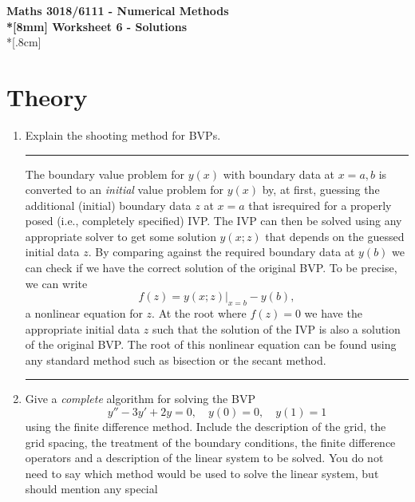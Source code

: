 \documentclass[10pt]{article}
\begin{document}
\thispagestyle{empty}
\begin{center}
\textbf{\Large Maths 3018/6111 - Numerical Methods \\*[8mm]
Worksheet 6 - Solutions}\\*[.8cm]
\end{center}

\section*{Theory}

\begin{enumerate}
\item Explain the shooting method for BVPs.
  \begin{center}
    \rule{0.9\textwidth}{.1pt}
  \end{center}
  The boundary value problem for $y(x)$ with boundary data at $x=a, b$
  is converted to an \emph{initial} value problem for $y(x)$ by, at
  first, guessing the additional (initial) boundary data $z$ at $x=a$
  that isrequired for a properly posed (i.e., completely specified)
  IVP. The IVP can then be solved using any appropriate solver to get
  some solution $y(x;z)$ that depends on the guessed initial data
  $z$. By comparing against the required boundary data at $y(b)$ we
  can check if we have the correct solution of the original BVP. To be
  precise, we can write
  \begin{equation*}
    f(z) = y(x;z)|_{x=b} - y(b),
  \end{equation*}
  a nonlinear equation for $z$. At the root where $f(z) = 0$ we have
  the appropriate initial data $z$ such that the solution of the IVP
  is also a solution of the original BVP. The root of this nonlinear
  equation can be found using any standard method such as bisection or
  the secant method.
  \begin{center}
    \rule{0.9\textwidth}{.1pt}
  \end{center}
\item Give a \emph{complete} algorithm for solving the BVP
  \begin{equation*}
    y'' - 3 y' + 2 y = 0, \quad y(0) = 0, \quad y(1) = 1
  \end{equation*}
  using the finite difference method. Include the description of the
  grid, the grid spacing, the treatment of the boundary conditions,
  the finite difference operators and a description of the linear
  system to be solved. You do not need to say which method would be
  used to solve the linear system, but should mention any special

\end{enumerate}
\end{document}
